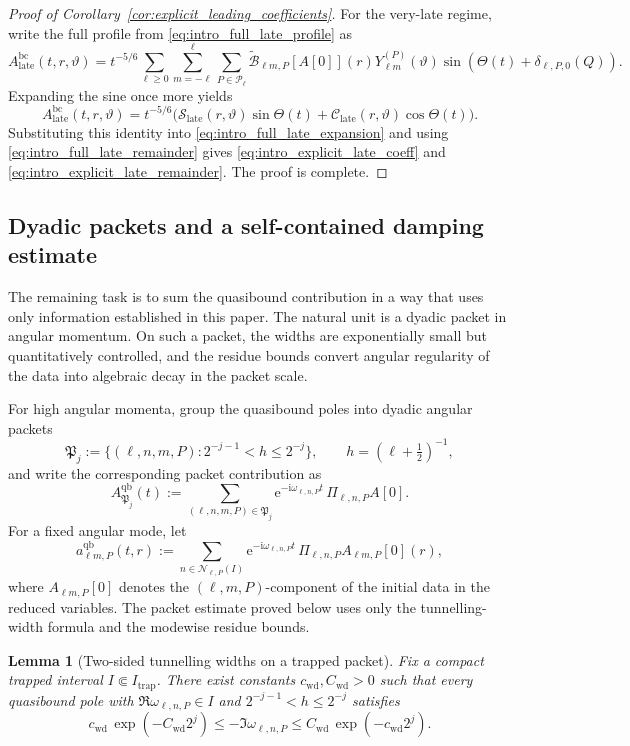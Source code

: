 \documentclass[12pt]{article}
\numberwithin{equation}{section}
\theoremstyle{plain}
\newtheorem{lemma}[theorem]{Lemma}
\theoremstyle{definition}
\theoremstyle{remark}
\newcommand{\ii}{\mathrm i}
\newcommand{\ee}{\mathrm e}
\newcommand{\bc}{\mathrm{bc}}
\newcommand{\qb}{\mathrm{qb}}
\newcommand{\cC}{\mathcal C}
\newcommand{\cS}{\mathcal S}
\begin{document}
\begin{proof}[Proof of Corollary~\ref{cor:explicit_leading_coefficients}]
For the very-late regime, write the full profile from \eqref{eq:intro_full_late_profile} as
\[
   A^{\bc}_{\mathrm{late}}(t,r,\vartheta)
   =
   t^{-5/6}
   \sum_{\ell\ge0}\sum_{m=-\ell}^{\ell}\sum_{P\in\mathcal P_\ell}
   \widetilde{\mathcal B}_{\ell m,P}[A[0]](r)
   Y_{\ell m}^{(P)}(\vartheta)
   \sin(\Theta(t)+\delta_{\ell,P,0}(Q)).
\]
Expanding the sine once more yields
\[
   A^{\bc}_{\mathrm{late}}(t,r,\vartheta)
   =
   t^{-5/6}
   \bigl(
      \cS_{\mathrm{late}}(r,\vartheta)\sin\Theta(t)
      +
      \cC_{\mathrm{late}}(r,\vartheta)\cos\Theta(t)
   \bigr).
\]
Substituting this identity into \eqref{eq:intro_full_late_expansion} and using \eqref{eq:intro_full_late_remainder} gives \eqref{eq:intro_explicit_late_coeff} and \eqref{eq:intro_explicit_late_remainder}.  The proof is complete.
\end{proof}



\subsection{Dyadic packets and a self-contained damping estimate}

The remaining task is to sum the quasibound contribution in a way that uses only information established in this paper.  The natural unit is a dyadic packet in angular momentum.  On such a packet, the widths are exponentially small but quantitatively controlled, and the residue bounds convert angular regularity of the data into algebraic decay in the packet scale.

For high angular momenta, group the quasibound poles into dyadic angular packets
\[
   \mathfrak P_j:=\{(\ell,n,m,P):2^{-j-1}<h\le2^{-j}\},
   \qquad h=(\ell+\tfrac12)^{-1},
\]
and write the corresponding packet contribution as
\[
   A^{\qb}_{\mathfrak P_j}(t)
   :=
   \sum_{(\ell,n,m,P)\in\mathfrak P_j}
   \ee^{-\ii\omega_{\ell,n,P}t}\,\Pi_{\ell,n,P}A[0].
\]
For a fixed angular mode, let
\[
   a^{\qb}_{\ell m,P}(t,r)
   :=
   \sum_{n\in\mathcal N_{\ell,P}(I)}
      \ee^{-\ii\omega_{\ell,n,P}t}\,
      \Pi_{\ell,n,P}A_{\ell m,P}[0](r),
\]
where $A_{\ell m,P}[0]$ denotes the $(\ell,m,P)$-component of the initial data in the reduced variables.  The packet estimate proved below uses only the tunnelling-width formula and the modewise residue bounds.

\begin{lemma}[Two-sided tunnelling widths on a trapped packet]\label{lem:packet_width_two_sided}
Fix a compact trapped interval $I\Subset I_{\mathrm{trap}}$.  There exist constants $c_{\mathrm{wd}},C_{\mathrm{wd}}>0$ such that every quasibound pole with $\Re\omega_{\ell,n,P}\in I$ and $2^{-j-1}<h\le2^{-j}$ satisfies
\[
   c_{\mathrm{wd}}\,\exp(-C_{\mathrm{wd}}2^j)
   \le
   -\Im\omega_{\ell,n,P}
   \le
   C_{\mathrm{wd}}\,\exp(-c_{\mathrm{wd}}2^j).
\]
\end{lemma}
\end{document}
